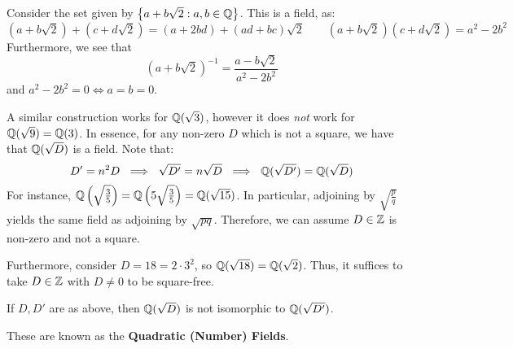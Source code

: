 
Consider the set given by $ \left\{{a + b\sqrt{2}:a,b \in \mathbb{Q}}\right\} $. This is a field, as:
\begin{equation*}
    (a+b\sqrt{2})+(c+d\sqrt{2}) = (a+2bd)+(ad+bc)\sqrt{2} \qquad
    (a+b\sqrt{2})(c+d\sqrt{2}) = a^{2}-2b^{2}
\end{equation*}
Furthermore, we see that
\begin{equation*}
    (a+b\sqrt{2})^{-1} = \frac{a-b\sqrt{2}}{a^{2}-2b^{2}}
\end{equation*}
and $ a^{2}-2b^{2} = 0 \iff a=b=0 $.

A similar construction works for $ \mathbb{Q}(\sqrt{3}) $, however it does \textit{not} work
for $ \mathbb{Q}(\sqrt{9}) = \mathbb{Q}(3) $.
In essence, for any non-zero $ D $ which is not a square, we have that $ \mathbb{Q}(\sqrt{D}) $ is
a field. Note that:
\begin{equation*}
    D' = n^{2}D \ \implies \ \sqrt{D'} = n\sqrt{D} \ \implies \
    \mathbb{Q}(\sqrt{D'}) = \mathbb{Q}(\sqrt{D})
\end{equation*}
For instance, $ \mathbb{Q}\left( \sqrt{\frac{3}{5}} \right)
= \mathbb{Q}\left( 5\sqrt{\frac{3}{5}} \right) = \mathbb{Q}(\sqrt{15}) $.
In particular, adjoining by $ \sqrt{\frac{p}{q}} $ yields the same field as adjoining by
$ \sqrt{pq} $. Therefore, we can assume $ D \in \mathbb{Z} $ is non-zero and not a square.

Furthermore, consider $ D = 18 = 2\cdot3^{2} $, so $ \mathbb{Q}(\sqrt{18}) = \mathbb{Q}(\sqrt{2}) $.
Thus, it suffices to take $ D \in \mathbb{Z} $ with $ D \neq 0 $ to be square-free.
\begin{exr}[source=Primary Source Material]
    If $ D, D' $ are as above, then $ \mathbb{Q}(\sqrt{D}) $ is not isomorphic to
    $ \mathbb{Q}(\sqrt{D'}) $.
\end{exr}
These are known as the \textbf{Quadratic (Number) Fields}.

